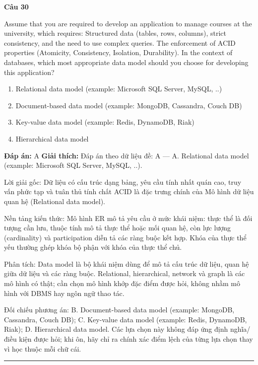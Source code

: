 \documentclass[11pt,a4paper]{article}
\newenvironment{question}[1]{%
  \par\vspace{1em}\noindent\textbf{\large Câu #1}\par\vspace{0.4em}
}{%
  \par\vspace{1em}\hrule\vspace{0.6em}
}
\newenvironment{choices}{%
  \begin{enumerate}[label=\textbf{\Alph*.},leftmargin=2.2em,itemsep=2pt,topsep=3pt]
}{%
  \end{enumerate}
}
\newcommand{\choice}{\item}
\begin{document}
\begin{question}{30}
Assume that you are required to develop an application to manage courses at the university, which requires: Structured data (tables, rows, columns), strict consistency, and the need to use complex queries. The enforcement of ACID properties (Atomicity, Consistency, Isolation, Durability). In the context of databases, which most appropriate data model should you choose for developing this application?
\begin{choices}
\choice Relational data model (example: Microsoft SQL Server, MySQL, ..)
\choice Document-based data model (example: MongoDB, Cassandra, Couch DB)
\choice Key-value data model (example: Redis, DynamoDB, Riak)
\choice Hierarchical data model
\end{choices}
\textbf{Đáp án:} A
\textbf{Giải thích:} Đáp án theo dữ liệu đề: A — A. Relational data model (example: Microsoft SQL Server, MySQL, ..).

Lời giải gốc: Dữ liệu có cấu trúc dạng bảng, yêu cầu tính nhất quán cao, truy vấn phức tạp và tuân thủ tính chất ACID là đặc trưng chính của Mô hình dữ liệu quan hệ (Relational data model).

Nền tảng kiến thức: Mô hình ER mô tả yêu cầu ở mức khái niệm: thực thể là đối tượng cần lưu, thuộc tính mô tả thực thể hoặc mối quan hệ, còn lực lượng (cardinality) và participation diễn tả các ràng buộc kết hợp. Khóa của thực thể yếu thường ghép khóa bộ phận với khóa của thực thể chủ.

Phân tích: Data model là bộ khái niệm dùng để mô tả cấu trúc dữ liệu, quan hệ giữa dữ liệu và các ràng buộc. Relational, hierarchical, network và graph là các mô hình có thật; cần chọn mô hình khớp đặc điểm được hỏi, không nhầm mô hình với DBMS hay ngôn ngữ thao tác.

Đối chiếu phương án: B. Document-based data model (example: MongoDB, Cassandra, Couch DB); C. Key-value data model (example: Redis, DynamoDB, Riak); D. Hierarchical data model. Các lựa chọn này không đáp ứng định nghĩa/điều kiện được hỏi; khi ôn, hãy chỉ ra chính xác điểm lệch của từng lựa chọn thay vì học thuộc mỗi chữ cái.
\end{question}
\end{document}
